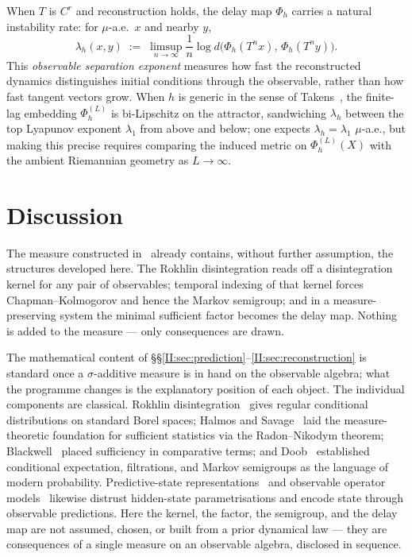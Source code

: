 \begin{remark}
\label{II:rem:lyapunov}
When $T$ is $C^r$ and reconstruction holds, the delay map $\Phi_h$ carries a
natural instability rate: for $\mu$-a.e.\ $x$ and nearby $y$,
\[
  \lambda_h(x,y)
  \;:=\;
  \limsup_{n\to\infty} \frac{1}{n}
  \log d\!\bigl(\Phi_h(T^n x),\, \Phi_h(T^n y)\bigr).
\]
This \emph{observable separation exponent} measures how fast the reconstructed
dynamics distinguishes initial conditions through the observable, rather than
how fast tangent vectors grow.  When $h$ is generic in the sense of
Takens~\cite{Takens1981}, the finite-lag embedding $\Phi_h^{(L)}$ is
bi-Lipschitz on the attractor, sandwiching $\lambda_h$ between the top
Lyapunov exponent $\lambda_1$ from above and below; one expects
$\lambda_h = \lambda_1$ $\mu$-a.e., but making this precise requires
comparing the induced metric on $\Phi_h^{(L)}(X)$ with the ambient
Riemannian geometry as $L \to \infty$.
\end{remark}


\section{Discussion}
\label{II:sec:discussion}

The measure constructed in~\cite{mahon_paper1} already contains, without
further assumption, the structures developed here.  The Rokhlin
disintegration reads off a disintegration kernel for any pair
of observables; temporal indexing of that kernel forces
Chapman--Kolmogorov and hence the Markov semigroup; and in a
measure-preserving system the minimal sufficient factor becomes the
delay map.  Nothing is added to the measure --- only consequences are
drawn.

The mathematical content of §§\ref{II:sec:prediction}--\ref{II:sec:reconstruction} is standard once a $\sigma$-additive measure is in hand on the observable algebra; what the programme changes is the explanatory position of each object.  The individual components are classical.  Rokhlin disintegration~\cite{Rokhlin1952}
gives regular conditional distributions on standard Borel spaces; Halmos and
Savage~\cite{HalmosSavage1949} laid the measure-theoretic foundation for sufficient
statistics via the Radon--Nikodym theorem; Blackwell~\cite{Blackwell1953} placed
sufficiency in comparative terms; and Doob~\cite{Doob1953} established conditional
expectation, filtrations, and Markov semigroups as the language of modern probability.
Predictive-state representations~\cite{Littman2001} and observable operator
models~\cite{Jaeger2000} likewise distrust hidden-state parametrisations and encode
state through observable predictions.  Here the kernel, the factor, the semigroup,
and the delay map are not assumed, chosen, or built from a prior dynamical law ---
they are consequences of a single measure on an observable algebra, disclosed in
sequence.

